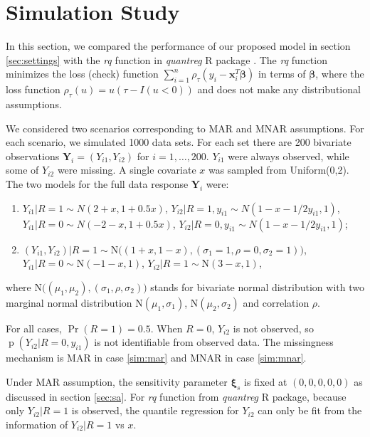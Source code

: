 \documentclass[12pt]{article}
\DeclareMathOperator{\pr}{p}
\DeclareMathOperator{\prob}{Pr}
\begin{document}
\section{Simulation Study}
\label{sec:simulation}
In this section, we compared the performance of our proposed model in
section \ref{sec:settings} with the \textit{rq} function in
\textit{quantreg} R package \citep{quantreg}. The \textit{rq} function
minimizes the loss (check) function $\sum_{i=1}^n \rho_{\tau} (y_i -
\bm x_i^T \bm \beta)$ in terms of $\bm \beta$, where the loss function
$\rho_{\tau} (u) = u(\tau - I(u < 0))$ and does not make any
distributional assumptions.

We considered two scenarios corresponding to MAR and MNAR
assumptions. For each scenario, we simulated 1000 data sets. For each
set there are 200 bivariate observations $\bm Y_i = (Y_{i1}, Y_{i2})$
for $i = 1, \ldots, 200$. $Y_{i1}$ were always observed, while some of
$Y_{i2}$ were missing. A single covariate $x$ was sampled from
Uniform(0,2). The two models for the full data response $\bm Y_i$
were:

\begin{enumerate}
\item \label{sim:mar} $ Y_{i1} |R = 1 \sim N ( 2 + x, 1 + 0.5x)$, $
  Y_{i2} | R = 1, y_{i1} \sim N(1 - x - 1/2y_{i1}, 1) $, $ Y_{i1}| R=
  0 \sim N(-2 - x, 1 + 0.5x) $, $ Y_{i2}| R= 0, y_{i1} \sim N(1 - x -
  1/2y_{i1}, 1)$;

\item \label{sim:mnar} $ ( Y_{i1}, Y_{i2}) |R = 1 \sim \textrm{N}
  \big( ( 1 + x, 1 - x), (\sigma_1 = 1, \rho = 0, \sigma_2 = 1)
  \big)$, $ Y_{i1} | R = 0 \sim \textrm{N}(-1-x, 1) $, $ Y_{i2} | R =
  1 \sim \textrm{N}(3-x, 1) $,
\end{enumerate}
where $\textrm{N}\big( (\mu_1, \mu_2), (\sigma_1, \rho, \sigma_2)
\big)$ stands for bivariate normal distribution with two marginal
normal distribution $\textrm{N}(\mu_1, \sigma_1)$, $\textrm{N}(\mu_2,
\sigma_2)$ and correlation $\rho$.

For all cases, $\prob (R = 1) = 0.5$.  When $R = 0$, $Y_{i2}$ is not
observed, so $\pr(Y_{i2}| R = 0, y_{i1})$ is not identifiable from
observed data. The missingness mechanism is MAR in case \ref{sim:mar}
and MNAR in case \ref{sim:mnar}.

Under MAR assumption, the sensitivity parameter $\bm \xi_s$ is fixed
at $(0,0,0,0,0)$ as discussed in section \ref{sec:sa}. For \textit{rq}
function from \textit{quantreg} R package, because only $Y_{i2}|R = 1$
is observed, the quantile regression for $Y_{i2}$ can only be fit from
the information of $Y_{i2}|R = 1$ vs $x$.
\end{document}
